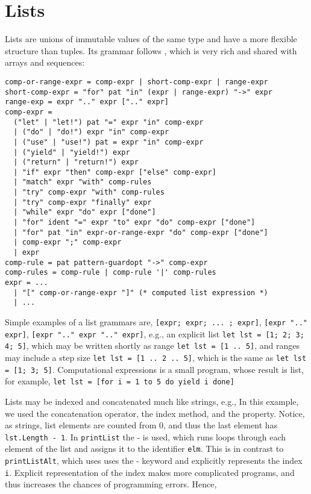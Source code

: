 \section{Lists}
Lists are unions of immutable values of the same type and have a more flexible structure than tuples. Its grammar follows , which is very rich and shared with arrays and sequences:
\begin{lstlisting}[language=ebnf]
comp-or-range-expr = comp-expr | short-comp-expr | range-expr
short-comp-expr = "for" pat "in" (expr | range-expr) "->" expr
range-exp = expr ".." expr [".." expr]
comp-expr =
  ("let" | "let!") pat "=" expr "in" comp-expr
  | ("do" | "do!") expr "in" comp-expr
  | ("use" | "use!") pat = expr "in" comp-expr
  | ("yield" | "yield!") expr
  | ("return" | "return!") expr
  | "if" expr "then" comp-expr ["else" comp-expr]
  | "match" expr "with" comp-rules
  | "try" comp-expr "with" comp-rules
  | "try" comp-expr "finally" expr
  | "while" expr "do" expr ["done"]
  | "for" ident "=" expr "to" expr "do" comp-expr ["done"]
  | "for" pat "in" expr-or-range-expr "do" comp-expr ["done"]
  | comp-expr ";" comp-expr
  | expr
comp-rule = pat pattern-guardopt "->" comp-expr
comp-rules = comp-rule | comp-rule '|' comp-rules
expr = ... 
  | "[" comp-or-range-expr "]" (* computed list expression *)
  | ...
\end{lstlisting}
Simple examples of a list grammars are, \lstinline[language=ebnf]![expr; expr; ... ; expr]!, \lstinline[language=ebnf]![expr ".." expr]!, \lstinline[language=ebnf]![expr ".." expr ".." expr]!, e.g., an explicit list \lstinline!let lst = [1; 2; 3; 4; 5]!, which may be written shortly as range \lstinline!let lst = [1 .. 5]!, and ranges may include a step size \lstinline!let lst = [1 .. 2 .. 5]!, which is the same as \lstinline!let lst = [1; 3; 5]!. Computational expressions is a small program, whose result is list, for example, \lstinline!let lst = [for i = 1 to 5 do yield i done]!

Lists may be indexed and concatenated much like strings, e.g.,
%
%
In this example, we used the  concatenation operator, the  index method, and the  property. Notice, as strings, list elements are counted from 0, and thus the last element has \lstinline!lst.Length - 1!. In \lstinline!printList! the - is used, which runs loops through each element of the list and assigns it to the identifier \lstinline!elm!. This is in contrast to \lstinline!printListAlt!, which uses uses the - keyword and explicitly represents the index \lstinline!i!. Explicit representation of the index makes more complicated programs, and thus increases the chances of programming errors. Hence, 


